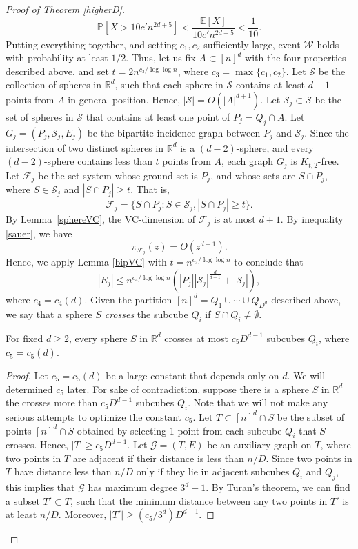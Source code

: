 \begin{proof}[Proof of Theorem \ref{higherD}]
%
%
$$\mathbb{P}[X> 10c'n^{2d + 5}] < \frac{\mathbb{E}[X]}{10c'n^{2d + 5}} < \frac{1}{10}.$$
%
 \noindent Putting everything together, and setting $c_1, c_2$ sufficiently large, event $\mathcal{W}$ holds with probability at least $1/2$.  
%
%
%
%
%
%
 Thus, let us fix $A\subset [n]^d$ with the four properties described above, and set $t = 2n^{c_3/\log\log n}$, where $c_3 = \max\{c_1,c_2\}$.  Let $\mathcal{S}$ be the collection of spheres in $\mathbb{R}^d$, such that each sphere in $\mathcal{S}$ contains at least $d+1$ points from $A$ in general position.  Hence, $|\mathcal{S}| = O(|A|^{d + 1})$. Let $\mathcal{S}_j \subset \mathcal{S}$ be the set of spheres in $\mathcal{S}$ that contains at least one point of $P_j  = Q_j\cap A$. Let $G_j = (P_j,\mathcal{S}_j,E_j)$ be the bipartite incidence graph between $P_j$ and $\mathcal{S}_j$.  Since the intersection of two distinct spheres in $\mathbb{R}^d$ is a $(d-2)$-sphere, and every $(d-2)$-sphere contains less than $t$ points from $A$, each graph $G_j$ is $K_{t,2}$-free. 
%
%
 Let $\mathcal{F}_{j}$ be the set system whose ground set is $P_{j}$, and whose sets are $S\cap P_{j}$, where $S \in \mathcal{S}_{j}$ and $|S\cap P_{j}| \geq t$.  That is, 
%
%
$$\mathcal{F}_{j} = \{S\cap P_{j}: S\in \mathcal{S}_{j}, |S\cap P_j| \geq t\}.$$
%
\noindent By Lemma~\ref{sphereVC}, the VC-dimension of $\mathcal{F}_j$ is at most $d+1$.  By inequality \eqref{sauer}, we have $$\pi_{\mathcal{F}_j}(z) = O(z^{d+1}).$$ Hence, we apply Lemma \ref{bipVC} with $t = n^{c_3/\log\log n}$ to conclude that  $$|E_j| \leq n^{c_4/\log\log n}\left(|P_j||\mathcal{S}_j|^{\frac{d}{d+1}} + |\mathcal{S}_j|\right),$$ where $c_4 = c_4(d)$.  
%
Given the partition $[n]^d = Q_1\cup \cdots \cup Q_{D^d}$ described above, we say that a sphere $S$ \emph{crosses} the subcube $Q_i$ if $S\cap Q_i\neq \emptyset$.  
%
\begin{observation}
For fixed $d \geq 2$, every sphere $S$ in $\mathbb{R}^d$ crosses at most $c_5D^{d-1}$ subcubes $Q_i$, where $c_5 = c_5(d)$.
\end{observation}
%
%
\begin{proof}
   Let $c_5 = c_5(d)$ be a large constant that depends only on $d$.  We will determined $c_5$ later.  For sake of contradiction, suppose there is a sphere $S$ in $\mathbb{R}^d$ the crosses more than $c_5D^{d-1}$ subcubes $Q_i$. Note that we will not make any serious attempts to optimize the constant $c_5$.
%
 Let $T \subset [n]^d\cap S$ be the subset of points $[n]^d\cap S$ obtained by selecting 1 point from each subcube $Q_i$ that $S$ crosses.  Hence, $|T| \geq c_5D^{d-1}.$ Let $\mathcal{G} = (T,E)$ be an auxiliary graph on $T$, where two points in $T$ are adjacent if their distance is less than $n/D$.  Since two points in $T$ have distance less than $n/D$ only if they lie in adjacent subcubes $Q_i$ and $Q_j$, this implies that $\mathcal{G}$ has maximum degree $3^d - 1$.  By Turan's theorem, we can find a subset $T'\subset T$, such that the minimum distance between any two points in $T'$ is at least $n/D$.  Moreover, $|T'| \geq (c_5/3^d)D^{d-1}$.  

\end{proof}
\end{proof}
